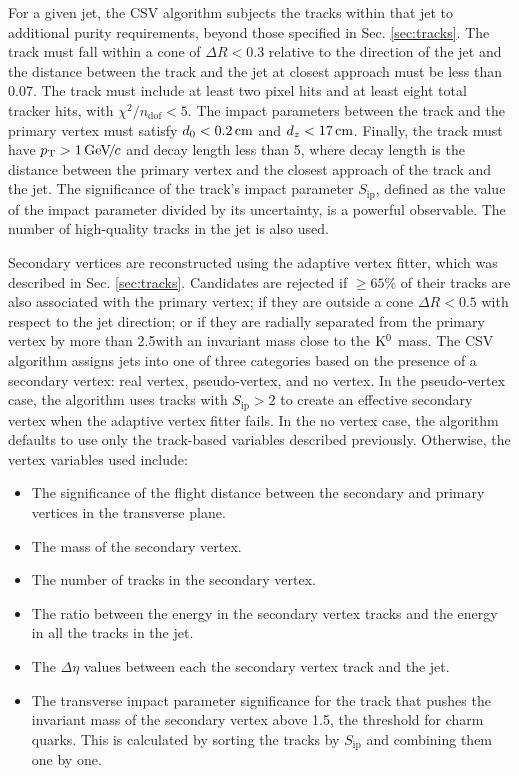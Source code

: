 For a given jet, the CSV algorithm subjects the tracks within that jet to additional purity requirements, beyond those specified in Sec. \ref{sec:tracks}. The track must fall within a cone of $\Delta R < 0.3$ relative to the direction of the jet and the distance between the track and the jet at closest approach must be less than 0.07\cm. The track must include at least two pixel hits and at least eight total tracker hits, with $\chi^2/n_{\text{dof}} < 5$. The impact parameters between the track and the primary vertex must satisfy $d_0 < 0.2\,\text{cm}$ and $d_z < 17\,\text{cm}$. Finally, the track must have $p_{\mathrm{T}}>1{\,\text{Ge\hspace{-.08em}V\hspace{-0.16em}/\hspace{-0.08em}}c}$ and decay length less than 5\cm, where decay length is the distance between the primary vertex and the closest approach of the track and the jet. The significance of the track's impact parameter $S_{\text{ip}}$, defined as the value of the impact parameter divided by its uncertainty, is a powerful observable. The number of high-quality tracks in the jet is also used.

Secondary vertices are reconstructed using the adaptive vertex fitter, which was described in Sec. \ref{sec:tracks}. Candidates are rejected if ${\geq}65\%$ of their tracks are also associated with the primary vertex; if they are outside a cone $\Delta R < 0.5$ with respect to the jet direction; or if they are radially separated from the primary vertex by more than 2.5\cm with an invariant mass close to the $\mathrm{K}^{0}$ mass. The CSV algorithm assigns jets into one of three categories based on the presence of a secondary vertex: real vertex, pseudo-vertex, and no vertex. In the pseudo-vertex case, the algorithm uses tracks with $S_{\text{ip}} > 2$ to create an effective secondary vertex when the adaptive vertex fitter fails. In the no vertex case, the algorithm defaults to use only the track-based variables described previously. Otherwise, the vertex variables used include:
\begin{itemize}
\item The significance of the flight distance between the secondary and primary vertices in the transverse plane.
\item The mass of the secondary vertex.
\item The number of tracks in the secondary vertex.
\item The ratio between the energy in the secondary vertex tracks and the energy in all the tracks in the jet.
\item The $\Delta\eta$ values between each the secondary vertex track and the jet.
\item The transverse impact parameter significance for the track that pushes the invariant mass of the secondary vertex above 1.5\GeVcc, the threshold for charm quarks. This is calculated by sorting the tracks by $S_{\text{ip}}$ and combining them one by one.
\end{itemize}

